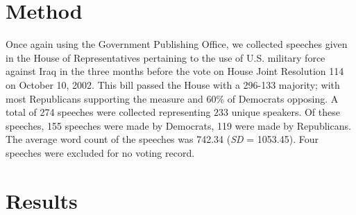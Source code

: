 \documentclass[english,man]{apa6}
\theoremstyle{definition}
\theoremstyle{definition}
\theoremstyle{definition}
\theoremstyle{remark}
\begin{document}
\section{Method}\label{method-3}

Once again using the Government Publishing Office, we collected speeches
given in the House of Representatives pertaining to the use of U.S.
military force against Iraq in the three months before the vote on House
Joint Resolution 114 on October 10, 2002. This bill passed the House
with a 296-133 majority; with most Republicans supporting the measure
and 60\% of Democrats opposing. A total of 274 speeches were collected
representing 233 unique speakers. Of these speeches, 155 speeches were
made by Democrats, 119 were made by Republicans. The average word count
of the speeches was 742.34 (\emph{SD} = 1053.45). Four speeches were
excluded for no voting record.

\section{Results}\label{results-2}
\end{document}
